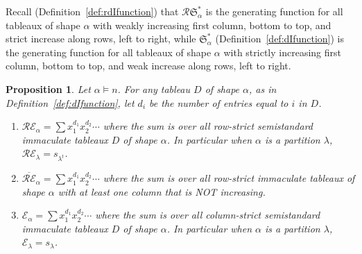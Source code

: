 \documentclass[12pt,letterpaper]{amsart}
\newtheorem{proposition}[theorem]{Proposition}
\theoremstyle{definition}
\newcommand{\dI}{\mathfrak{S}^*}
\newcommand{\rdI}{\mathcal{R}\mathfrak{S}^*}
\begin{document}
Recall (Definition~\ref{def:rdIfunction}) that $\rdI_\alpha$ is the generating function for all tableaux of shape $\alpha$ with weakly increasing first column, bottom to top, and strict increase along rows, left to right, while $\dI_\alpha$ (Definition~\ref{def:dIfunction}) is the generating function for all tableaux of shape $\alpha$ with strictly increasing first column, bottom to top, and weak increase along rows, left to right.
\begin{proposition}\label{prop:gf-row-ext} Let $\alpha\vDash n$.  For any tableau $D$ of shape $\alpha$, as in Definition~\ref{def:dIfunction}, let $d_i$ be the number of entries equal to $i$ in $D$. 
\begin{enumerate}
\item $\mathcal{R}\mathcal{E}_\alpha=\sum x_1^{d_1}x_2^{d_2}\cdots$ where the sum is over all row-strict semistandard immaculate tableaux $D$  of shape $\alpha$.  In particular when $\alpha$ is a partition $\lambda$, $\mathcal{R}\mathcal{E}_\lambda=s_{\lambda^t}$.
\item  $\overline{\mathcal{R}\mathcal{E}}_\alpha=\sum x_1^{d_1}x_2^{d_2}\cdots$ where the sum is over all row-strict immaculate tableaux of shape $\alpha$ with at least one column that is NOT increasing. 
\item \cite[Definition~8, Theorem~11, and Section~7]{CFLSX2014} $\mathcal{E}_\alpha=\sum x_1^{d_1}x_2^{d_2}\cdots$ where the sum is over all  column-strict semistandard immaculate tableaux $D$  of shape $\alpha$.  In particular when $\alpha$ is a partition $\lambda$, $\mathcal{E}_\lambda=s_{\lambda}$.
\end{enumerate}
\end{proposition}
\end{document}
